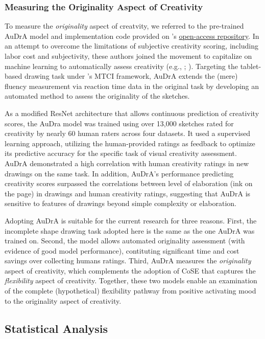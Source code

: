 \documentclass[../MA_Thesis.tex]{subfiles}
\begin{document}
\subsubsection*{Measuring the Originality Aspect of Creativity}
To measure the \textit{originality} aspect of creatvity, we referred to the pre-trained AuDrA model and implementation code provided on \textcite{patterson_audra_2023}'s \href{https://osf.io/kqn9v/}{open-access repository}. In an attempt to overcome the limitations of subjective creativity scoring, including labor cost and subjectivity, these authors joined the movement to capitalize on machine learning to automatically assess creativity (e.g., \cite{acar_applying_2023}; \cite{beaty_automating_2021}). Targeting the tablet-based drawing task under \textcite{barbot_dynamics_2018}'s MTCI framework, AuDrA extends the (mere) fluency measurement via reaction time data in the original task by developing an automated method to assess the originality of the sketches.

As a modified ResNet architecture that allows continuous prediction of creativity scores, the AuDra model was trained using over 13,000 sketches rated for creativity by nearly 60 human raters across four datasets. It used a supervised learning approach, utilizing the human-provided ratings as feedback to optimize its predictive accuracy for the specific task of visual creativity assessment. AuDrA demonstrated a high correlation with human creativity ratings in new drawings on the same task. In addition, AuDrA's performance predicting creativity scores surpassed the correlations between level of elaboration (ink on the page) in drawings and human creativity ratings, suggesting that AuDrA is sensitive to features of drawings beyond simple complexity or elaboration. 

Adopting AuDrA is suitable for the current research for three reasons. First, the incomplete shape drawing task adopted here is the same as the one AuDrA was trained on. Second, the model allows automated originality assessment (with evidence of good model performance), contituting significant time and cost savings over collecting humans ratings. Third, AuDrA measures the \textit{originality} aspect of creativity, which complements the adoption of CoSE that captures the \textit{flexibility} aspect of creativity. Together, these two models enable an examination of the complete (hypothetical) flexibility pathway from positive activating mood to the originality aspect of creativity.

\subsection*{Statistical Analysis}
\end{document}
